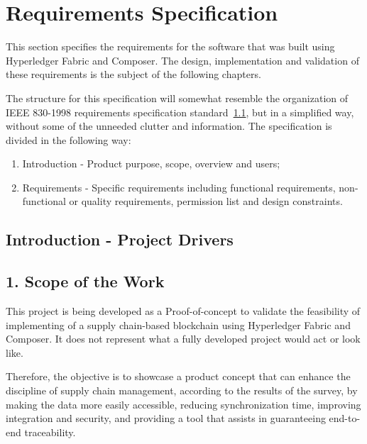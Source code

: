 \section{Requirements Specification}
\label{sec:requirements-specs}
This section specifies the requirements for the software that was built using Hyperledger Fabric and Composer. The design, implementation and validation of these requirements is the subject of the following chapters.

The structure for this specification will somewhat resemble the organization of IEEE 830-1998 requirements specification standard~\ref{}, but in a simplified way, without some of the unneeded clutter and information. The specification is divided in the following way:
\begin{enumerate}
	\item Introduction - Product purpose, scope, overview and users;
	\item Requirements - Specific requirements including functional requirements, non-functional or quality requirements, permission list and design constraints.
\end{enumerate}

\subsection{Introduction - Project Drivers}

\subsection*{1. Scope of the Work}
		\par This project is being developed as a Proof-of-concept to validate the feasibility of implementing of a supply chain-based blockchain using Hyperledger Fabric and Composer. It does not represent what a fully developed project would act or look like.

		\par Therefore, the objective is to showcase a product concept that can enhance the discipline of supply chain management, according to the results of the survey, by making the data more easily accessible, reducing synchronization time, improving integration and security, and providing a tool that assists in guaranteeing end-to-end traceability.


